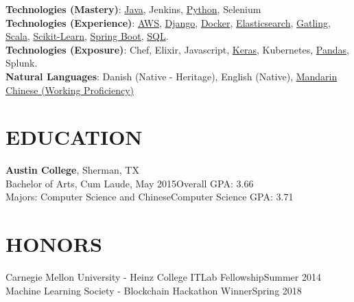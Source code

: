 \documentclass[margin]{res}
\begin{document}
\begin{resume}
\textbf{Technologies (Mastery)}: \href{http://www.lucaskjaerozhang.com/technology/java/}{Java}, Jenkins, \href{https://www.lucaskjaerozhang.com/technology/python/}{Python}, Selenium
\\
\textbf{Technologies (Experience)}: \href{https://www.lucaskjaerozhang.com/technology/aws}{AWS},
\href{https://www.lucaskjaerozhang.com/technology/django}{Django},
\href{https://www.lucaskjaerozhang.com/technology/docker}{Docker},
\href{https://www.lucaskjaerozhang.com/technology/elasticsearch}{Elasticsearch},
\href{http://www.lucaskjaerozhang.com/technology/gatling/}{Gatling}, \href{http://www.lucaskjaerozhang.com/technology/scala/}{Scala}, \href{https://www.lucaskjaerozhang.com/technology/sklearn/}{Scikit-Learn},
\href{https://www.lucaskjaerozhang.com/technology/spring-boot}{Spring Boot}, \href{https://www.lucaskjaerozhang.com/technology/sql}{SQL}.
\\
\textbf{Technologies (Exposure)}: Chef, Elixir, Javascript,  \href{http://www.lucaskjaerozhang.com/technology/keras/}{Keras}, Kubernetes, \href{http://www.lucaskjaerozhang.com/technology/pandas/}{Pandas}, Splunk.
\\
\textbf{Natural Languages}: Danish (Native - Heritage), English (Native), \href{https://www.lucaskjaerozhang.com/lucas-kjaero-zhang-%E4%B8%AA%E4%BA%BA%E7%AE%80%E5%8E%86.pdf}{Mandarin Chinese (Working Proficiency)}


\section{EDUCATION}
\textbf{Austin College}, Sherman, TX\\
Bachelor of Arts, Cum Laude, May 2015\hfill Overall GPA:
3.66\\
Majors: Computer Science and Chinese\hfill Computer Science GPA: 3.71\\

\section{HONORS}
Carnegie Mellon University - Heinz College ITLab Fellowship\hfill Summer 2014\\
Machine Learning Society - Blockchain Hackathon Winner\hfill Spring 2018

\end{resume}
\end{document}
